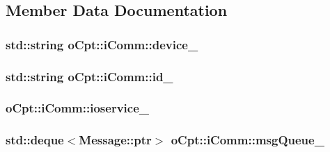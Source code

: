 \subsection{Member Data Documentation}
\subsubsection[{\texorpdfstring{device\+\_\+}{device_}}]{\setlength{\rightskip}{0pt plus 5cm}std\+::string o\+Cpt\+::i\+Comm\+::device\+\_\+\hspace{0.3cm}{\ttfamily [protected]}}\hypertarget{classo_cpt_1_1i_comm_a26b537ee10eb14c0a15bb2ad4c4b7cda}{}\label{classo_cpt_1_1i_comm_a26b537ee10eb14c0a15bb2ad4c4b7cda}
\subsubsection[{\texorpdfstring{id\+\_\+}{id_}}]{\setlength{\rightskip}{0pt plus 5cm}std\+::string o\+Cpt\+::i\+Comm\+::id\+\_\+\hspace{0.3cm}{\ttfamily [protected]}}\hypertarget{classo_cpt_1_1i_comm_a65678a6bfb2da392d2932b0cd5d818c6}{}\label{classo_cpt_1_1i_comm_a65678a6bfb2da392d2932b0cd5d818c6}
\subsubsection[{\texorpdfstring{ioservice\+\_\+}{ioservice_}}]{ o\+Cpt\+::i\+Comm\+::ioservice\+\_\+\hspace{0.3cm}{\ttfamily [protected]}}\hypertarget{classo_cpt_1_1i_comm_a40e1c5e7d35a83973c1b913da9143a2f}{}\label{classo_cpt_1_1i_comm_a40e1c5e7d35a83973c1b913da9143a2f}
\subsubsection[{\texorpdfstring{msg\+Queue\+\_\+}{msgQueue_}}]{\setlength{\rightskip}{0pt plus 5cm}std\+::deque$<${\bf Message\+::ptr}$>$ o\+Cpt\+::i\+Comm\+::msg\+Queue\+\_\+\hspace{0.3cm}{\ttfamily [protected]}}\hypertarget{classo_cpt_1_1i_comm_aa4bc236cd4492ea8b4fd2481de58b43f}{}\label{classo_cpt_1_1i_comm_aa4bc236cd4492ea8b4fd2481de58b43f}
